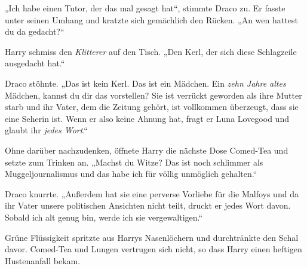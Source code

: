 „Ich habe einen Tutor, der das mal gesagt hat“, stimmte Draco zu. Er fasste unter seinen Umhang und kratzte sich gemächlich den Rücken. „An wen hattest du da gedacht?“

Harry schmiss den \emph{Klitterer} auf den Tisch. „Den Kerl, der sich diese Schlagzeile ausgedacht hat.“

Draco stöhnte. „Das ist kein Kerl. Das ist ein Mädchen. Ein \emph{zehn Jahre altes} Mädchen, kannst du dir das vorstellen? Sie ist verrückt geworden als ihre Mutter starb und ihr Vater, dem die Zeitung gehört, ist vollkommen überzeugt, dass sie eine Seherin ist. Wenn er also keine Ahnung hat, fragt er Luna Lovegood und glaubt ihr \emph{jedes Wort}.“

Ohne darüber nachzudenken, öffnete Harry die nächste Dose Comed-Tea und setzte zum Trinken an. „Machst du Witze? Das ist noch schlimmer als Muggeljournalismus und das habe ich für völlig unmöglich gehalten.“

Draco knurrte. „Außerdem hat sie eine perverse Vorliebe für die Malfoys und da ihr Vater unsere politischen Ansichten nicht teilt, druckt er jedes Wort davon. Sobald ich alt genug bin, werde ich sie vergewaltigen.“

Grüne Flüssigkeit spritzte aus Harrys Nasenlöchern und durchtränkte den Schal davor. Comed-Tea und Lungen vertrugen sich nicht, so dass Harry einen heftigen Hustenanfall bekam.

